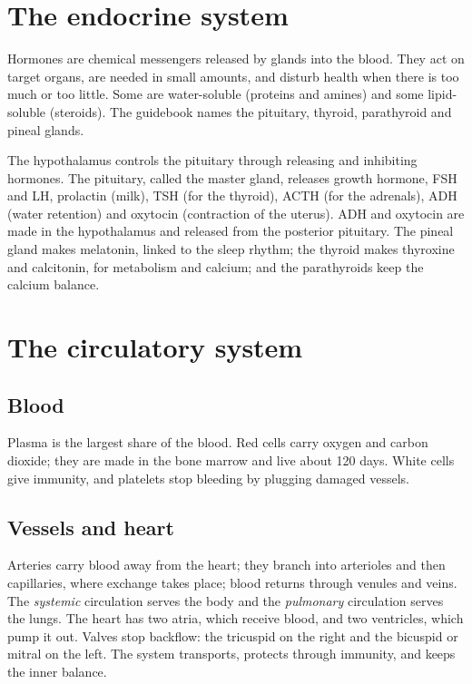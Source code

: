 
\section{The endocrine system}

Hormones are chemical messengers released by glands into the blood. They act on target organs, are needed in small amounts, and disturb health when there is too much or too little. Some are water-soluble (proteins and amines) and some lipid-soluble (steroids). The guidebook names the pituitary, thyroid, parathyroid and pineal glands.

The hypothalamus controls the pituitary through releasing and inhibiting hormones. The pituitary, called the master gland, releases growth hormone, FSH and LH, prolactin (milk), TSH (for the thyroid), ACTH (for the adrenals), ADH (water retention) and oxytocin (contraction of the uterus). ADH and oxytocin are made in the hypothalamus and released from the posterior pituitary. The pineal gland makes melatonin, linked to the sleep rhythm; the thyroid makes thyroxine and calcitonin, for metabolism and calcium; and the parathyroids keep the calcium balance.


\section{The circulatory system}

\subsection*{Blood}
Plasma is the largest share of the blood. Red cells carry oxygen and carbon dioxide; they are made in the bone marrow and live about 120 days. White cells give immunity, and platelets stop bleeding by plugging damaged vessels.

\subsection*{Vessels and heart}
Arteries carry blood away from the heart; they branch into arterioles and then capillaries, where exchange takes place; blood returns through venules and veins. The \emph{systemic} circulation serves the body and the \emph{pulmonary} circulation serves the lungs. The heart has two atria, which receive blood, and two ventricles, which pump it out. Valves stop backflow: the tricuspid on the right and the bicuspid or mitral on the left. The system transports, protects through immunity, and keeps the inner balance.

